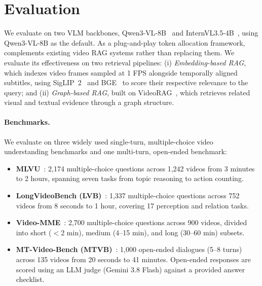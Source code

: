 \section{Evaluation}
\label{sec:exp}


We evaluate \name on two VLM backbones, Qwen3-VL-8B~\cite{bai2025qwen3vl} and InternVL3.5-4B~\cite{wang2025internvl35}, using Qwen3-VL-8B as the default. As a plug-and-play token allocation framework, \name complements existing video RAG systems rather than replacing them. We evaluate its effectiveness on two retrieval pipelines:
(i) \textit{Embedding-based RAG}, which indexes video frames sampled at 1 FPS alongside temporally aligned subtitles, using SigLIP~2~\cite{siglip2} and BGE~\cite{bge} to score their respective relevance to the query; and
(ii) \textit{Graph-based RAG}, built on VideoRAG~\cite{ren2025videorag}, which retrieves related visual and textual evidence through a graph structure.


\paragraph{Benchmarks.} 

We evaluate on three widely used single-turn, multiple-choice video understanding benchmarks and one multi-turn, open-ended benchmark:
\begin{itemize}\setlength{\itemsep}{0pt}\setlength{\parskip}{0pt}\setlength{\topsep}{2pt}
\item \textbf{MLVU}~\cite{zhou2024mlvu}: 2,174 multiple-choice questions across 1,242 videos from 3 minutes to 2 hours, spanning seven tasks from topic reasoning to action counting.

\item \textbf{LongVideoBench (LVB)}~\cite{wu2024longvideobench}: 1,337 multiple-choice questions across 752 videos from 8 seconds to 1 hour, covering 17 perception and relation tasks.

\item \textbf{Video-MME}~\cite{fu2024videomme}: 2,700 multiple-choice questions across 900 videos, divided into short ($<$2 min), medium (4--15 min), and long (30--60 min) subsets.

\item \textbf{MT-Video-Bench (MTVB)}~\cite{mtvideobench2025}: 1,000 open-ended dialogues (5--8 turns) across 135 videos from 20 seconds to 41 minutes. Open-ended responses are scored using an LLM judge (Gemini 3.8 Flash) against a provided answer checklist.
\end{itemize}


